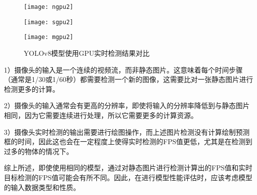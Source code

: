 \documentclass{ctexart}
\numberwithin{equation}{section}%
\numberwithin{figure}{section}%
\numberwithin{table}{section}%
\begin{document}
	\begin{figure}[h]
		\centering
		\begin{minipage}{0.28\linewidth}
			\centering
			\texttt{[image: ngpu2]}
		\end{minipage}
		\begin{minipage}{0.28\linewidth}
			\centering
			\texttt{[image: sgpu2]}
		\end{minipage}
		\begin{minipage}{0.28\linewidth}
			\centering
			\texttt{[image: mgpu2]}
		\end{minipage}
		\caption{YOLOv8模型使用GPU实时检测结果对比}
		\label{t422}%
	\end{figure}

	1）摄像头的输入是一个连续的视频流，而非静态图片。这意味着每个时间步骤（通常是1/30或1/60秒）都需要检测一个新的图像，这需要比对一张静态图片进行检测更多的计算。
	
	2）摄像头的输入通常会有更高的分辨率，即使将输入的分辨率降低到与静态图片相同，因为它需要连续进行处理，所以它需要更多的计算资源。
	
	3）摄像头实时检测的输出需要进行绘图操作，而上述图片检测没有计算绘制预测框的时间，因此这也会在一定程度上使得实时检测的FPS值更低，尤其是在检测到过多的物体的情况下。
	
	综上所述，即使使用相同的模型，通过对静态图片进行检测计算出的FPS值和实时目标检测的FPS值可能会有所不同。因此，在进行模型性能评估时，应该考虑模型的输入数据类型和性质。
	
\end{document}
